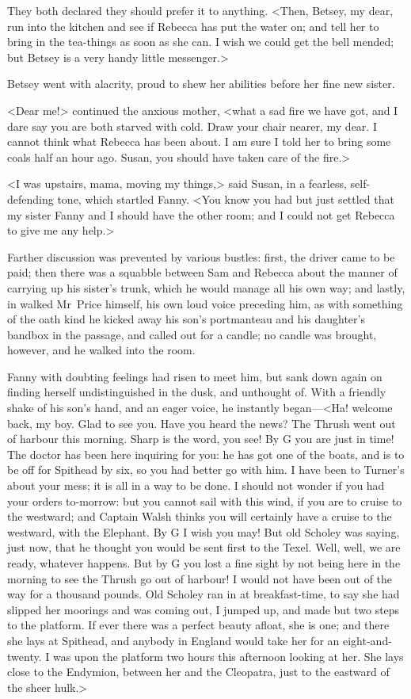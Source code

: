 They both declared they should prefer it to anything. <Then, Betsey, my dear, run into the kitchen and see if Rebecca has put the water on; and tell her to bring in the tea-things as soon as she can. I wish we could get the bell mended; but Betsey is a very handy little messenger.>

Betsey went with alacrity, proud to shew her abilities before her fine new sister.

<Dear me!> continued the anxious mother, <what a sad fire we have got, and I dare say you are both starved with cold. Draw your chair nearer, my dear. I cannot think what Rebecca has been about. I am sure I told her to bring some coals half an hour ago. Susan, you should have taken care of the fire.>

<I was upstairs, mama, moving my things,> said Susan, in a fearless, self-defending tone, which startled Fanny. <You know you had but just settled that my sister Fanny and I should have the other room; and I could not get Rebecca to give me any help.>

Farther discussion was prevented by various bustles: first, the driver came to be paid; then there was a squabble between Sam and Rebecca about the manner of carrying up his sister's trunk, which he would manage all his own way; and lastly, in walked Mr~Price himself, his own loud voice preceding him, as with something of the oath kind he kicked away his son's portmanteau and his daughter's bandbox in the passage, and called out for a candle; no candle was brought, however, and he walked into the room.

Fanny with doubting feelings had risen to meet him, but sank down again on finding herself undistinguished in the dusk, and unthought of. With a friendly shake of his son's hand, and an eager voice, he instantly began—<Ha! welcome back, my boy. Glad to see you. Have you heard the news? The Thrush went out of harbour this morning. Sharp is the word, you see! By G\emdashpunct{,} you are just in time! The doctor has been here inquiring for you: he has got one of the boats, and is to be off for Spithead by six, so you had better go with him. I have been to Turner's about your mess; it is all in a way to be done. I should not wonder if you had your orders to-morrow: but you cannot sail with this wind, if you are to cruise to the westward; and Captain Walsh thinks you will certainly have a cruise to the westward, with the Elephant. By G\emdashpunct{,} I wish you may! But old Scholey was saying, just now, that he thought you would be sent first to the Texel. Well, well, we are ready, whatever happens. But by G\emdashpunct{,} you lost a fine sight by not being here in the morning to see the Thrush go out of harbour! I would not have been out of the way for a thousand pounds. Old Scholey ran in at breakfast-time, to say she had slipped her moorings and was coming out, I jumped up, and made but two steps to the platform. If ever there was a perfect beauty afloat, she is one; and there she lays at Spithead, and anybody in England would take her for an eight-and-twenty. I was upon the platform two hours this afternoon looking at her. She lays close to the Endymion, between her and the Cleopatra, just to the eastward of the sheer hulk.>

